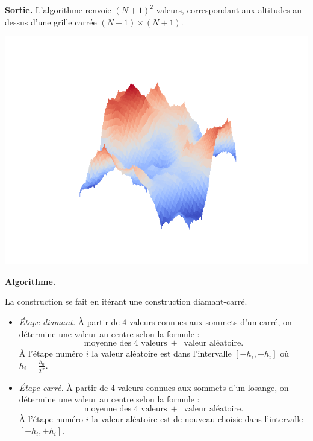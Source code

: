 \documentclass[11pt,class=report,crop=false]{standalone}
\begin{document}
\textbf{Sortie.}
L'algorithme renvoie $(N+1)^2$ valeurs, correspondant aux altitudes au-dessus d'une grille carrée $(N+1) \times (N+1)$.


\begin{center}
\includegraphics[scale=\myscale,scale=0.5]{figures/hauteurs-02}
\end{center}

\medskip



\textbf{Algorithme.}

La construction se fait en itérant une construction \og{}diamant-carré\fg{}.

\begin{itemize}

  \item \emph{Étape diamant.} 
  À partir de $4$ valeurs connues aux sommets d'un carré, on détermine une valeur au centre selon la formule :
  $$\text{moyenne des $4$ valeurs} \ + \ \text{ valeur aléatoire}.$$
  À l'étape numéro $i$ la valeur aléatoire est dans l'intervalle $[-h_i,+h_i]$ où $h_i = \frac{h_0}{2^{ir}}$.





  \item \emph{Étape carré.}
  À partir de $4$ valeurs connues aux sommets d'un losange, on détermine une valeur au centre selon la formule :
  $$\text{moyenne des $4$ valeurs} \ + \ \text{ valeur aléatoire}.$$
  À l'étape numéro $i$ la valeur aléatoire est de nouveau choisie dans l'intervalle $[-h_i,+h_i]$.



\end{itemize}
\end{document}
